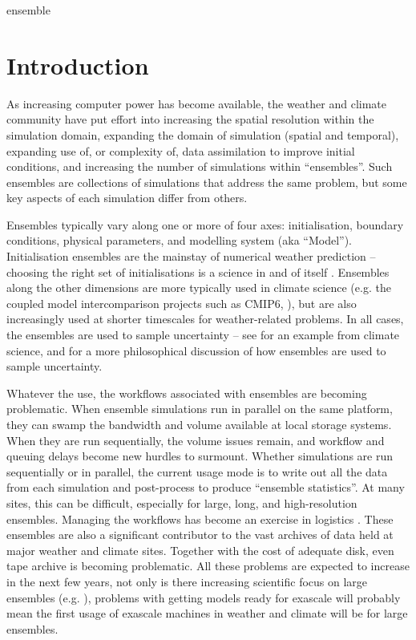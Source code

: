 \documentclass[twocolumn, 5p, times]{elsarticle}
\begin{document}
\begin{keyword}
ensemble
\end{keyword}

\maketitle

\section{Introduction}

As increasing computer power has become available, the weather and climate community have put effort into increasing the spatial resolution within the simulation domain, expanding the domain of simulation (spatial and temporal), expanding use of, or complexity of, data assimilation to improve initial conditions, and increasing the number of simulations within ``ensembles''. Such ensembles are collections of simulations that address the same problem, but some key aspects of each simulation differ from others. 

Ensembles typically vary along one or more of four axes: initialisation, boundary conditions, physical parameters, and modelling system (aka ``Model''). Initialisation ensembles are the mainstay of numerical weather prediction -- choosing the right set of initialisations is a science in and of itself \cite{BuiEA05}. Ensembles along the other dimensions are more typically used in climate science (e.g. the coupled model intercomparison projects such as CMIP6, \cite{MeeEA14}), but are also increasingly used at shorter timescales for weather-related problems. In all cases, the ensembles are used to sample uncertainty -- see \cite{HawSut09} for an example from climate science, and \cite{Parker10} for a more philosophical discussion of how ensembles are used to sample uncertainty.

Whatever the use, the workflows associated with ensembles are becoming problematic. When ensemble simulations run in parallel on the same platform, they can swamp the bandwidth and volume available at local storage systems. When they are run sequentially, the volume issues remain, and workflow and queuing delays become new hurdles to surmount.
 Whether simulations are run sequentially or in parallel, the current usage mode is to write out all the data from each simulation and post-process to produce ``ensemble statistics''. At many sites, this can be difficult, especially for large, long, and high-resolution ensembles.   
 Managing the workflows has become an exercise in logistics \cite{MizEA09}. These ensembles are also a significant contributor to the vast archives of data held at major weather and climate sites. Together with the cost of adequate disk, even tape archive is becoming problematic. 
 All these problems are expected to increase in the next few years, not only is there increasing scientific focus on large ensembles (e.g. \cite{YeaEA18}), problems with getting models ready for exascale \cite{LawEA18} will probably mean the first usage of exascale machines in weather and climate will be for large ensembles.
\end{document}
